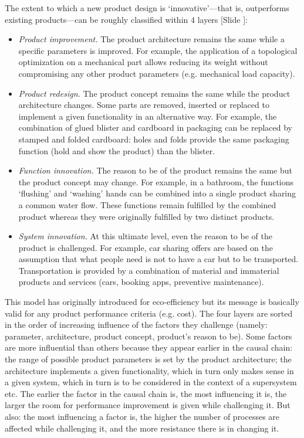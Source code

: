 \documentclass{article}
\newcounter{slide}
\begin{document}
The extent to which a new product design is `innovative'---that is, outperforms existing products---can be roughly classified within 4 layers  {\color{blue}[Slide ]}\cite{bhamraEcodesignSearchNew2004}:
\begin{itemize}
	\item \emph{Product improvement.} The product architecture remains the same while a specific parameters is improved. For example, the application of a topological optimization on a mechanical part allows reducing its weight without compromising any other product parameters (e.g. mechanical load capacity).
	\item \emph{Product redesign.} The product concept remains the same while the product architecture changes. Some parts are removed, inserted or replaced to implement a given functionality in an alternative way. For example, the combination of glued blister and cardboard in packaging can be replaced by stamped and folded cardboard: holes and folds provide the same packaging function (hold and show the product) than the blister. 
	\item \emph{Function innovation.} The reason to be of the product remains the same but the product concept may change. For example, in a bathroom, the functions `flushing' and `washing' hands can be combined into a single product sharing a common water flow. These functions remain fulfilled by the combined product whereas they were originally fulfilled by two distinct products.
	\item \emph{System innovation.} At this ultimate level, even the reason to be of the product is challenged. For example, car sharing offers are based on the assumption that what people need is not to have a car but to be transported. Transportation is provided by a combination of material and immaterial products and services (cars, booking apps, preventive maintenance).
\end{itemize}
This model has originally introduced for eco-efficiency \cite{brezet1997dynamics} but its message is basically valid for any product performance criteria (e.g. cost). The four layers are sorted in the order of increasing influence of the factors they challenge (namely: parameter, architecture, product concept, product's reason to be). Some factors are more influential than others because they appear earlier in the causal chain: the range of possible product parameters is set by the product architecture; the architecture implements a given functionality, which in turn only makes sense in a given system, which in turn is to be considered in the context of a supersystem etc. The earlier the factor in the causal chain is, the most influencing it is, the larger the room for performance improvement is given while challenging it. But also: the most influencing a factor is, the higher the number of processes are affected while challenging it, and the more resistance there is in changing it. 
\end{document}

